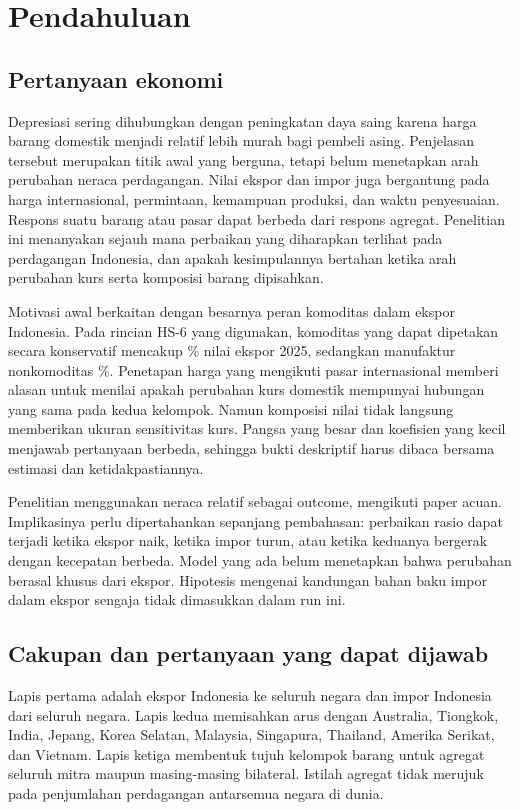 \section{Pendahuluan}\label{sec:intro}
\subsection{Pertanyaan ekonomi}
Depresiasi sering dihubungkan dengan peningkatan daya saing karena harga barang domestik menjadi relatif lebih murah bagi pembeli asing. Penjelasan tersebut merupakan titik awal yang berguna, tetapi belum menetapkan arah perubahan neraca perdagangan. Nilai ekspor dan impor juga bergantung pada harga internasional, permintaan, kemampuan produksi, dan waktu penyesuaian. Respons suatu barang atau pasar dapat berbeda dari respons agregat. Penelitian ini menanyakan sejauh mana perbaikan yang diharapkan terlihat pada perdagangan Indonesia, dan apakah kesimpulannya bertahan ketika arah perubahan kurs serta komposisi barang dipisahkan.

Motivasi awal berkaitan dengan besarnya peran komoditas dalam ekspor Indonesia. Pada rincian HS-6 yang digunakan, komoditas yang dapat dipetakan secara konservatif mencakup \CommodityShare\% nilai ekspor 2025, sedangkan manufaktur nonkomoditas \ManufacturingShare\%. Penetapan harga yang mengikuti pasar internasional memberi alasan untuk menilai apakah perubahan kurs domestik mempunyai hubungan yang sama pada kedua kelompok. Namun komposisi nilai tidak langsung memberikan ukuran sensitivitas kurs. Pangsa yang besar dan koefisien yang kecil menjawab pertanyaan berbeda, sehingga bukti deskriptif harus dibaca bersama estimasi dan ketidakpastiannya.

Penelitian menggunakan neraca relatif sebagai outcome, mengikuti paper acuan. Implikasinya perlu dipertahankan sepanjang pembahasan: perbaikan rasio dapat terjadi ketika ekspor naik, ketika impor turun, atau ketika keduanya bergerak dengan kecepatan berbeda. Model yang ada belum menetapkan bahwa perubahan berasal khusus dari ekspor. Hipotesis mengenai kandungan bahan baku impor dalam ekspor sengaja tidak dimasukkan dalam run ini.

\subsection{Cakupan dan pertanyaan yang dapat dijawab}
Lapis pertama adalah ekspor Indonesia ke seluruh negara dan impor Indonesia dari seluruh negara. Lapis kedua memisahkan arus dengan Australia, Tiongkok, India, Jepang, Korea Selatan, Malaysia, Singapura, Thailand, Amerika Serikat, dan Vietnam. Lapis ketiga membentuk tujuh kelompok barang untuk agregat seluruh mitra maupun masing-masing bilateral. Istilah agregat tidak merujuk pada penjumlahan perdagangan antarsemua negara di dunia.

